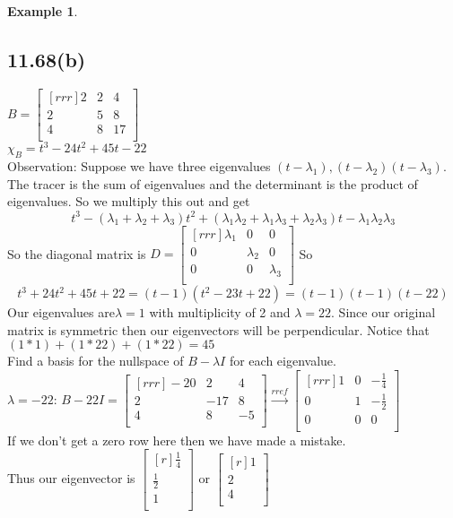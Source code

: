 \documentclass{report}
\theoremstyle{plain}
\theoremstyle{definition}
\newtheorem*{ex}{Example}
\theoremstyle{plain}
\begin{document}
\begin{ex}
\subsection{11.68(b)}
$B=\begin{bmatrix}[rrr]2&2&4\\2&5&8\\4&8&17\\\end{bmatrix}$\\
$\chi_B=t^3-24t^2+45t-22$\\
Observation: Suppose we have three eigenvalues $(t-\lambda_1 ),(t-\lambda_2 )(t-\lambda_3)$. The tracer is the sum of eigenvalues and the determinant is the product of eigenvalues. So we multiply this out and get
\[ t^3-(\lambda_1+\lambda_2+\lambda_3)t^2+(\lambda_1\lambda_2+\lambda_1\lambda_3+\lambda_2\lambda_3)t-\lambda_1\lambda_2\lambda_3 \]
So the diagonal matrix is $D=\begin{bmatrix}[rrr]\lambda_1&0&0\\0&\lambda_2&0\\0&0&\lambda_3\\\end{bmatrix}$
So
\[ t^3+24t^2+45t+22 = (t-1)(t^2-23t+22)=(t-1)(t-1)(t-22) \]
Our eigenvalues are$\lambda=1$ with multiplicity of 2 and $\lambda=22$. Since our original matrix is symmetric then our eigenvectors will be perpendicular.
Notice that $(1*1)+(1*22)+(1*22) = 45$\\
Find a basis for the nullspace of $B-\lambda I$ for each eigenvalue.\\
$\lambda=-22$: $B-22I=\begin{bmatrix}[rrr]-20&2&4\\2&-17&8\\4&8&-5\\\end{bmatrix}\xrightarrow[]{rref} \begin{bmatrix}[rrr]1&0&-\frac{1}{4}\\0&1&-\frac{1}{2}\\0&0&0\\\end{bmatrix}$\\
If we don't get a zero row here then we have made a mistake.\\
Thus our eigenvector is $\begin{bmatrix}[r]\frac{1}{4}\\\frac{1}{2}\\1\\\end{bmatrix}$ or $\begin{bmatrix}[r]1\\2\\4\\\end{bmatrix}$\\

\end{ex}
\end{document}
